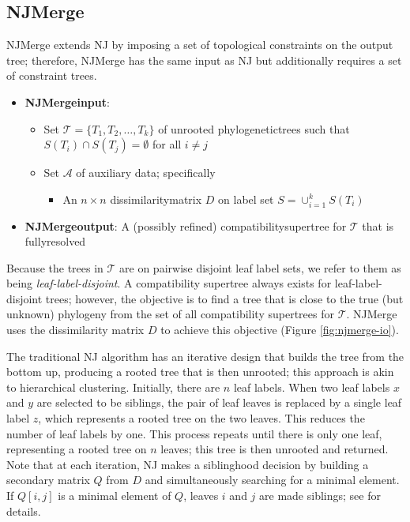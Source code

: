 \subsection{NJMerge}
NJMerge extends \gls{NJ} by imposing a set of topological constraints on the output tree; therefore, NJMerge has the same input as NJ but additionally requires a set of constraint trees.
\begin{itemize}
	\item \textbf{\gls{NJMergeinput}}: 
	\begin{itemize}
		\item Set $\mathcal{T} = \{T_1, T_2, \dots, T_k\}$ of \gls{unrooted} \glspl{phylogenetictree} such that $S(T_i) \cap S(T_j) = \emptyset$ for all $i \ne j$
		\item Set $\mathcal{A}$ of auxiliary data; specifically
		\begin{itemize}
			\item An $n \times n$ \gls{dissimilaritymatrix} $D$ on label set $S = \cup_{i=1}^k S(T_i)$
		\end{itemize}
	\end{itemize}
	\item \textbf{\gls{NJMergeoutput}}:  A (possibly refined) \gls{compatibilitysupertree} for $\mathcal{T}$ that is \gls{fullyresolved}
\end{itemize}
Because the trees in $\mathcal{T}$ are on pairwise disjoint leaf label sets, we refer to them as being \textit{\gls{leaf-label-disjoint}}.
A compatibility supertree always exists for leaf-label-disjoint trees; however, the objective is to find a tree that is close to the true (but unknown) phylogeny from the set of all compatibility supertrees for $\mathcal{T}$.
NJMerge uses the dissimilarity matrix $D$ to achieve this objective (Figure \ref{fig:njmerge-io}).

The traditional NJ algorithm has an iterative design that builds the tree from the bottom up, producing a \gls{rooted} tree that is then unrooted; this approach is akin to hierarchical clustering.
Initially, there are $n$ leaf labels.
When two leaf labels $x$ and $y$ are selected to be siblings, the pair of leaf leaves is replaced by a single leaf label $z$, which represents a rooted tree on the two leaves.
This reduces the number of leaf labels by one.
This process repeats until there is only one leaf, representing a rooted tree on $n$ leaves; this tree is then unrooted and returned.
Note that at each iteration, NJ makes a siblinghood decision by building a secondary matrix $Q$ from $D$ and simultaneously searching for a minimal element. 
If $Q[i,j]$ is a minimal element of $Q$, leaves $i$ and $j$ are made siblings; see \cite{saitou1987neighbor} for details.

